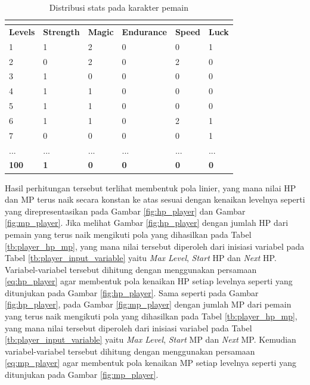 \begin{longtable}{|l|l|l|l|l|l|}
	\caption{Distribusi stats pada karakter pemain}
	\vspace{1ex}
	\label{tb:player_hp_mp_4}\\
	\hline
	\rowcolor[HTML]{C0C0C0} 
	\textbf{Levels} & \textbf{Strength} & \textbf{Magic} & \textbf{Endurance} & \textbf{Speed} & \textbf{Luck} \\ \hline
	1 & 1 & 2 & 0 & 0 & 1 \\ \hline
	2 & 0 & 2 & 0 & 2 & 0 \\ \hline
	3 & 1 & 0 & 0 & 0 & 0 \\ \hline
	4 & 1 & 1 & 0 & 0 & 0 \\ \hline
	5 & 1 & 1 & 0 & 0 & 0 \\ \hline
	6 & 1 & 1 & 0 & 2 & 1 \\ \hline
	7 & 0 & 0 & 0 & 0 & 1 \\ \hline
	... & ... & ... & ... & ... & ... \\ \hline
	\textbf{100} & \textbf{1} & \textbf{0} & \textbf{0} & \textbf{0} & \textbf{0} \\ \hline
\end{longtable}
\vspace{1ex}

Hasil perhitungan tersebut terlihat membentuk pola linier, yang mana nilai HP dan MP terus naik secara konstan ke atas sesuai dengan kenaikan levelnya seperti yang direpresentasikan pada Gambar \ref{fig:hp_player} dan Gambar \ref{fig:mp_player}. Jika melihat Gambar \ref{fig:hp_player} dengan jumlah HP dari pemain yang terus naik mengikuti pola yang dihasilkan pada Tabel \ref{tb:player_hp_mp}, yang mana nilai tersebut diperoleh dari inisiasi variabel pada Tabel \ref{tb:player_input_variable} yaitu \textit{Max Level}, \textit{Start} HP dan \textit{Next} HP. Variabel-variabel tersebut dihitung dengan menggunakan persamaan \ref{eq:hp_player} agar membentuk pola kenaikan HP setiap levelnya seperti yang ditunjukan pada Gambar \ref{fig:hp_player}. Sama seperti pada Gambar \ref{fig:hp_player}, pada Gambar \ref{fig:mp_player} dengan jumlah MP dari pemain yang terus naik mengikuti pola yang dihasilkan pada Tabel \ref{tb:player_hp_mp}, yang mana nilai tersebut diperoleh dari inisiasi variabel pada Tabel \ref{tb:player_input_variable} yaitu \textit{Max Level}, \textit{Start} MP dan \textit{Next} MP. Kemudian variabel-variabel tersebut dihitung dengan menggunakan persamaan \ref{eq:mp_player} agar membentuk pola kenaikan MP setiap levelnya seperti yang ditunjukan pada Gambar \ref{fig:mp_player}. 

